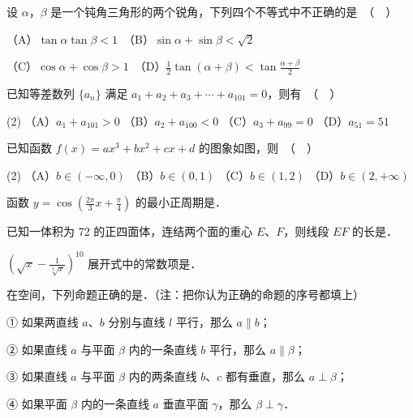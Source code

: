\begin{question}
设 $\alpha$，$\beta$ 是一个钝角三角形的两个锐角，下列四个不等式中不正确的是　（　）

（A）$\tan\alpha\tan\beta < 1$　（B）$\sin\alpha + \sin\beta < \sqrt{2}$

（C）$\cos\alpha + \cos\beta > 1$　（D）$\frac{1}{2}\tan(\alpha+\beta) < \tan\frac{\alpha+\beta}{2}$

\end{question}
\begin{question}
已知等差数列 $\{a_n\}$ 满足 $a_1 + a_2 + a_3 + \cdots + a_{101} = 0$，则有　（　）

\begin{gkopts}(2)
\task （A）$a_1 + a_{101} > 0$
\task （B）$a_2 + a_{100} < 0$
\task （C）$a_3 + a_{99} = 0$
\task （D）$a_{51} = 51$
\end{gkopts}

\Needspace{0.4\textheight}
\end{question}
\begin{question}
已知函数 $f(x) = ax^3 + bx^2 + cx + d$ 的图象如图，则　（　）
\nopagebreak[4]
\begin{center}\end{center}
\nopagebreak[4]
\begin{gkopts}(2)
\task （A）$b \in (-\infty, 0)$
\task （B）$b \in (0, 1)$
\task （C）$b \in (1, 2)$
\task （D）$b \in (2, +\infty)$
\end{gkopts}

\end{question}

\begin{question}
函数 $y = \cos\left(\frac{2\pi}{3}x + \frac{\pi}{4}\right)$ 的最小正周期是\gkblank{}．

\end{question}
\begin{question}
已知一体积为 72 的正四面体，连结两个面的重心 $E$、$F$，则线段 $EF$ 的长是\gkblank{}．

\end{question}
\begin{question}
$\left(\sqrt{x} - \frac{1}{\sqrt[3]{x}}\right)^{10}$ 展开式中的常数项是\gkblank{}．

\end{question}
\begin{question}
在空间，下列命题正确的是\gkblank{}．（注：把你认为正确的命题的序号都填上）

① 如果两直线 $a$、$b$ 分别与直线 $l$ 平行，那么 $a \parallel b$；

② 如果直线 $a$ 与平面 $\beta$ 内的一条直线 $b$ 平行，那么 $a \parallel \beta$；

③ 如果直线 $a$ 与平面 $\beta$ 内的两条直线 $b$、$c$ 都有垂直，那么 $a \perp \beta$；

④ 如果平面 $\beta$ 内的一条直线 $a$ 垂直平面 $\gamma$，那么 $\beta \perp \gamma$．

\end{question}


